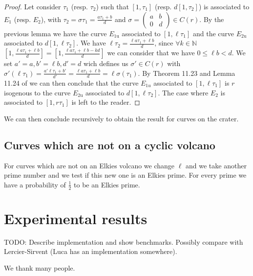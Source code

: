 \documentclass{lms}
\newcommand{\todo}[1]{{\color{red}TODO: #1}}
\begin{document}
\begin{proof}
Let consider $\tau_1$ (resp. $\tau_2$)  such that $[1,\tau_1]$ (resp. $d[1,\tau_2]$) is associated to $E_1$ (resp. $E_2$), with $\tau_2=\sigma \tau_1 =\frac{a\tau_1+b}{d}$ and $\sigma =\left(\begin{array}{cc}
a & b\\
0 & d
\end{array}\right) \in C(r)$. 
\newline
By the previous lemma we have the curve $E_{1\mathrm{u}}$ associated to $[1,\ell \tau_1]$ and the curve $E_{2\mathrm{u}}$ associated to $d[1,\ell \tau_2]$.
\newline
We have $\ell \tau_2=\frac{\ell a\tau_1+\ell b}{d}$, since $\forall k \in \mathbb{N}$ $[1,\frac{\ell a\tau_1+\ell b}{d}]=[1,\frac{\ell a\tau_1+\ell b-kd}{d}]$ we can consider that we have $0 \leqslant \ell b<d$.
We set $a'=a, b'=\ell b, d'=d$ wich defines us $\sigma' \in C(r)$ with $\sigma'(\ell \tau_1)=\frac{a'\ell \tau_1+ b'}{d'}=\frac{\ell a\tau_1+\ell b}{d}=\ell \sigma(\tau_1)$. By Theorem 11.23 and Lemma 11.24 of \cite{Cox89} we can then conclude that the curve $E_{1u}$ associated to $[1,\ell \tau_1]$ is $r$ isogenous to the curve $E_{2\mathrm{u}}$ associated to $d[1,\ell \tau_2]$. The case where $E_2$ is associated to $[1,r\tau_1]$ is left to the reader. %
\end{proof}
 We can then conclude recursively to obtain the result for curves on the crater.

  \subsection{Curves which are not on a cyclic volcano}
  For curves which are not on an Elkies volcano we change $\ell$ and we take another prime number and we test if this new one is an Elkies prime. For every prime we have a probability of $\frac{1}{2}$ to be an Elkies prime. 



\section{Experimental results}
\label{sec:implem}

\todo{Describe implementation and show benchmarks. Possibly compare
  with Lercier-Sirvent (Luca has an implementation somewhere).}

\begin{acknowledgements}
  We thank many people.
\end{acknowledgements}
\end{document}
